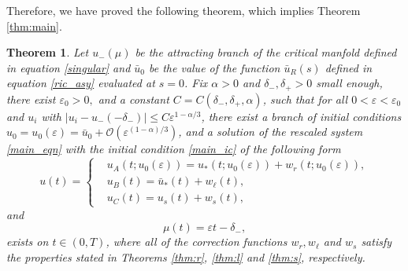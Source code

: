 \documentclass[letterpaper,11pt]{article}
\newcommand{\rmO}{\mathcal{O}}
\newcommand{\eps}{\varepsilon}
\numberwithin{equation}{section}
\theoremstyle{plain}
\newtheorem{theorem}{Theorem}[section]
\begin{document}
Therefore, we have proved the following theorem, which implies Theorem \ref{thm:main}.
\begin{theorem}\label{thm:glue}
Let $u_-(\mu)$ be the attracting branch of the critical manfold defined in equation \eqref{singular} and $\bar{u}_0$ be the value of the function $\bar{u}_R(s)$ defined in equation \eqref{ric_asy} evaluated at $s=0$.
Fix $\alpha>0$ and $\delta_-,\delta_+>0$ small enough, there exist $\eps_0>0,$ and a constant $C=C(\delta_-,\delta_+,\alpha)$, such that for all $0<\eps<\eps_0$ and $u_i$ with $|u_i - u_-(-\delta_-)| \le C\eps^{1-\alpha/3}$, there exist a branch of initial conditions $u_0= u_0(\eps) = \bar{u}_0 + \rmO(\eps^{(1-\alpha)/3})$, and a solution of the rescaled system 
\eqref{main_eqn} with the initial condition
\eqref{main_ic} of the following form
\begin{equation}
u(t)=\begin{cases}
&u_A(t; u_0(\eps))= u_*(t;u_0(\eps)) + w_r(t;u_0(\eps)), \\
&u_B(t)=\bar{u}_*(t) + w_\ell(t), \\
&u_C(t)=u_s(t) + w_s(t),
\end{cases}
\end{equation}
and 
\begin{equation}
\mu(t) = \eps t -\delta_-,
\end{equation}
exists on $t \in (0,T)$, where all of the correction functions $w_r, w_\ell$ and $w_s$ satisfy the properties stated in Theorems \ref{thm:r}, \ref{thm:l} and \ref{thm:s}, respectively.
\end{theorem}
\end{document}
